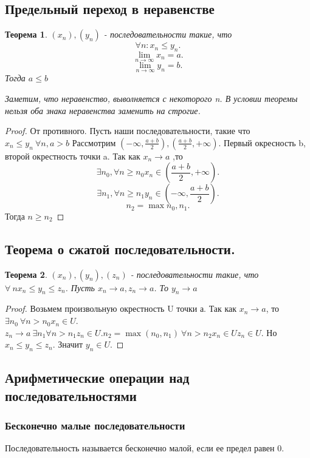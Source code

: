 \documentclass[a4paper]{scrartcl}
\newtheorem{theorem}{Теорема}
\begin{document}
\subsection{Предельный переход в неравенстве}
\begin{theorem}
	$(x_n),(y_n)$ - последовательности такие, что
	\[
		\forall n : x_n \le  y_n
		.\]
	\[
		\lim_{n \to \infty} x_n = a
		.\]
	\[
		\lim_{n \to \infty} y_n = b
		.\]
	Тогда $a \le  b$

	Заметим, что неравенство, выволняется с некоторого n. В условии теоремы нельзя оба знака неравенства заменить на строгие.
\end{theorem}
\begin{proof}
	От противного. Пусть наши последовательности, такие что $x_n \le  y_n ~ \forall n, a > b$
	Рассмотрим $(-\infty, \frac{a + b}{2}) , (\frac{a + b }{2}, +\infty)$. Первый окресность b,
	второй окрестность точки a. Так как $x_n \rightarrow a$ ,то
	\[
		\exists n_0 , \forall n \ge n_0 x_n \in (\frac{a + b}{2}, +\infty)
		.\]
	\[
		\exists  n_1 , \forall  n\ge n_1 y_{n} \in (-\infty,\frac{a + b}{2})
		.\]
	\[
		n_2 = \max{n_0,n_1}
		.\]
	Тогда $n \ge  n_2$
\end{proof}
\subsection{Теорема о сжатой последовательности.} \label{menti}
\begin{theorem}
	$(x_n),(y_n),(z_n)$ - последовательности такие, что  $\forall ~  n x_n \le y_{n} \le z_n$.
	Пусть $x_n \rightarrow a, z_n \rightarrow a$. То  $y_n \rightarrow a$
\end{theorem}
\begin{proof}
	Возьмем произвольную окрестность U точки а. Так как $x_n \to a$, то  $\exists n_0 ~ \forall
		n > n_0 x_n \in U$. $z_n \to a  ~ \exists  n_1 \forall  n > n_1 z_n \in U. n_2 = \max{(n_0,n_1)}
		~ \forall n > n_2 x_n \in U z_n \in U$. Но $x_n \le  y_n \le z_n$. Значит $y_n \in U$.
\end{proof}
\subsection{Арифметические операции над последовательностями}
\subsubsection{Бесконечно малые последовательности}
Последовательность называется бесконечно малой, если ее предел равен 0.
\end{document}
